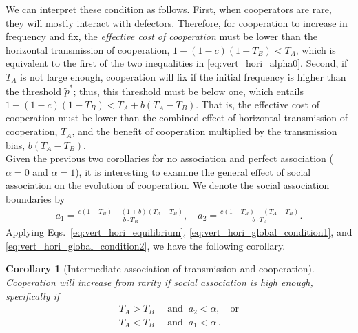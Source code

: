 \documentclass[12pt]{extarticle}
\newtheorem{corollary}{Corollary}
\begin{document}
{We can interpret these condition as follows. First, when cooperators are rare, they will mostly interact with defectors. Therefore, for cooperation to increase in frequency and fix, the \emph{effective cost of cooperation} must be lower than the horizontal transmission of cooperation, $1-(1-c)(1-T_B) < T_A$, which is equivalent to the first of the two inequalities in \autoref{eq:vert_hori_alpha0}.
Second, if $T_A$ is not large enough, cooperation will fix if the initial frequency is higher than the threshold $\tilde{p}^*$; thus, this threshold must be below one, which entails $1-(1-c)(1-T_B) < T_A + b(T_A-T_B)$. That is, the effective cost of cooperation must be lower than the combined effect of horizontal transmission of cooperation, $T_A$, and the benefit of cooperation multiplied by the transmission bias, $b(T_A-T_B)$. 
\\

Given the previous two corollaries for no association and perfect association ($\alpha=0$ and $\alpha=1$), it is interesting to examine the general effect of social association on the evolution of cooperation.
We denote the social association boundaries by
\begin{equation}\begin{aligned}\label{eq:boundries_assortative_meeting}
  a_1 = \frac{c(1-T_B)-(1+b)(T_A-T_B)}{b\cdot T_B}, \quad
  a_2 = \frac{c(1-T_B)-(T_A-T_B)}{b\cdot T_A}.
\end{aligned}\end{equation}
Applying Eqs.~\ref{eq:vert_hori_equilibrium}, \ref{eq:vert_hori_global_condition1}, and \ref{eq:vert_hori_global_condition2}, we have the following corollary.
\\

\begin{corollary}[Intermediate association of transmission and cooperation]\label{corollary:Intermediate_association}
Cooperation will increase from rarity if social association is high enough, specifically if
  \begin{equation} \label{eq:unequal_transmission_from_rarity_in_alpha_terms}
    \begin{aligned}
    T_A > T_B &\;\; \text{and} \;\; a_2 < \alpha, \quad \text{or} \\
    T_A < T_B &\;\; \text{and} \;\; a_1 < \alpha \,.
    \end{aligned}
    \end{equation} 
\end{corollary}

}
\end{document}
